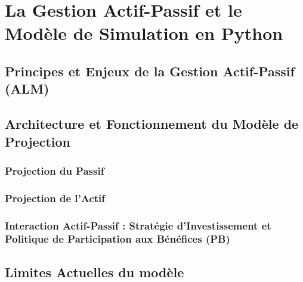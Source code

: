 \chapter{La Gestion Actif-Passif et le Modèle de Simulation en Python}

\section{Principes et Enjeux de la Gestion Actif-Passif (ALM)}

\section{Architecture et Fonctionnement du Modèle de Projection}
    \subsection{Projection du Passif}
    \subsection{Projection de l'Actif}
    \subsection{Interaction Actif-Passif : Stratégie d'Investissement et Politique de Participation aux Bénéfices (PB)}

\section{Limites Actuelles du modèle}



